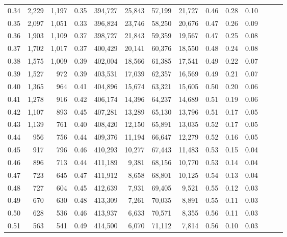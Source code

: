\begin{tabular}{rrrrrrrrrrrrrr}
0.34 &   2,229 &  1,197 &  0.35 &  394,727 &   25,843 &  57,199 &  21,727 &  0.46 &  0.28 &      0.10 \\
0.35 &   2,097 &  1,051 &  0.33 &  396,824 &   23,746 &  58,250 &  20,676 &  0.47 &  0.26 &      0.09 \\
0.36 &   1,903 &  1,109 &  0.37 &  398,727 &   21,843 &  59,359 &  19,567 &  0.47 &  0.25 &      0.08 \\
0.37 &   1,702 &  1,017 &  0.37 &  400,429 &   20,141 &  60,376 &  18,550 &  0.48 &  0.24 &      0.08 \\
0.38 &   1,575 &  1,009 &  0.39 &  402,004 &   18,566 &  61,385 &  17,541 &  0.49 &  0.22 &      0.07 \\
0.39 &   1,527 &    972 &  0.39 &  403,531 &   17,039 &  62,357 &  16,569 &  0.49 &  0.21 &      0.07 \\
0.40 &   1,365 &    964 &  0.41 &  404,896 &   15,674 &  63,321 &  15,605 &  0.50 &  0.20 &      0.06 \\
0.41 &   1,278 &    916 &  0.42 &  406,174 &   14,396 &  64,237 &  14,689 &  0.51 &  0.19 &      0.06 \\
0.42 &   1,107 &    893 &  0.45 &  407,281 &   13,289 &  65,130 &  13,796 &  0.51 &  0.17 &      0.05 \\
0.43 &   1,139 &    761 &  0.40 &  408,420 &   12,150 &  65,891 &  13,035 &  0.52 &  0.17 &      0.05 \\
0.44 &     956 &    756 &  0.44 &  409,376 &   11,194 &  66,647 &  12,279 &  0.52 &  0.16 &      0.05 \\
0.45 &     917 &    796 &  0.46 &  410,293 &   10,277 &  67,443 &  11,483 &  0.53 &  0.15 &      0.04 \\
0.46 &     896 &    713 &  0.44 &  411,189 &    9,381 &  68,156 &  10,770 &  0.53 &  0.14 &      0.04 \\
0.47 &     723 &    645 &  0.47 &  411,912 &    8,658 &  68,801 &  10,125 &  0.54 &  0.13 &      0.04 \\
0.48 &     727 &    604 &  0.45 &  412,639 &    7,931 &  69,405 &   9,521 &  0.55 &  0.12 &      0.03 \\
0.49 &     670 &    630 &  0.48 &  413,309 &    7,261 &  70,035 &   8,891 &  0.55 &  0.11 &      0.03 \\
0.50 &     628 &    536 &  0.46 &  413,937 &    6,633 &  70,571 &   8,355 &  0.56 &  0.11 &      0.03 \\
0.51 &     563 &    541 &  0.49 &  414,500 &    6,070 &  71,112 &   7,814 &  0.56 &  0.10 &      0.03 \\

\end{tabular}
